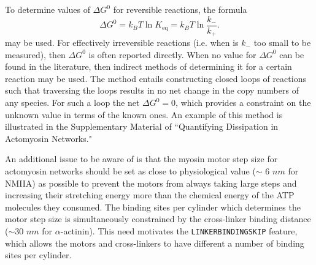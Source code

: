 \documentclass[11pt, oneside]{article}   	%
\begin{document}
To determine values of $\Delta G^0$ for reversible reactions, the formula
\begin{equation}
\Delta G^0 = k_B T \ln K_\text{eq} = k_B T \ln \frac{k_-}{k_+}.
\label{eqd}
\end{equation} 
may be used.  For effectively irreversible reactions (i.e. when is $k_-$ too small to be measured), then $\Delta G^0$ is often reported directly.  When no value for $\Delta G^0$ can be found in the literature, then indirect methods of determining it for a certain reaction may be used.  The method entails constructing closed loops of reactions such that traversing the loops results in no net change in the copy numbers of any species.  For such a loop the net $\Delta G^0 = 0$, which provides a constraint on the unknown value in terms of the known ones.  An example of this method is illustrated in the Supplementary Material of ``Quantifying Dissipation in Actomyosin Networks."  

 
An additional issue to be aware of is that the myosin motor step size for actomyosin networks should be set as close to physiological value ($\sim$ 6 $nm$ for NMIIA) as possible to prevent the motors from always taking large steps and increasing their stretching energy more than the chemical energy of the ATP molecules they consumed.  The binding sites per cylinder which determines the motor step size is simultaneously constrained by the cross-linker binding distance ($\sim$30 $nm$ for $\alpha$-actinin).  This need motivates the \texttt{LINKERBINDINGSKIP} feature, which allows the motors and cross-linkers to have different a number of binding sites per cylinder.    

  
		
\end{document}
